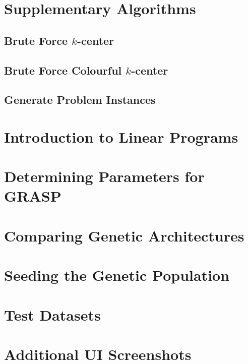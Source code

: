 \documentclass{article}
\begin{document}
\newpage
\appendix
\section{Supplementary Algorithms}\label{appendix:algorithms}
    \subsection{Brute Force \texorpdfstring{$k$}{k}-center}
        \label{brute-force-k-center}
        
    \subsection{Brute Force Colourful \texorpdfstring{$k$}{k}-center}
        \label{brute-force-colourful-k-center}
        
    \subsection{Generate Problem Instances}\label{appendix:generate_problem_instances}
        

\section{Introduction to Linear Programs}
    \label{appendix:lp_intro}
            

\section{Determining Parameters for GRASP}\label{appendix:grasp_param}
    
    
\section{Comparing Genetic Architectures}\label{appendix:genetic_architectures}
    
\newpage    
\section{Seeding the Genetic Population}\label{appendix:seed_population}
    

\section{Test Datasets}\label{appendix:test_datasets}
    

\newpage    
\section{Additional UI Screenshots}\label{appendix:learn}
    

\newpage
\printglossaries

\end{document}
